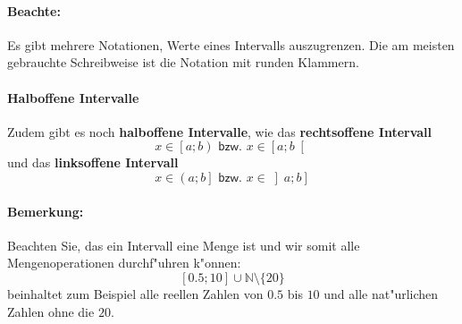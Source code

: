 \paragraph{Beachte:} Es gibt mehrere Notationen, Werte eines Intervalls auszugrenzen. Die am meisten gebrauchte Schreibweise ist die Notation mit runden Klammern.

\paragraph{Halboffene Intervalle}
\begin{flushleft}
Zudem gibt es noch \textbf{halboffene Intervalle}, wie das \textbf{rechtsoffene Intervall}
\begin{equation*}
x \in \left[a;b \right) \textsf{ bzw. } x \in \left[a;b \right[
\end{equation*}
und das \textbf{linksoffene Intervall}
\begin{equation*}
x \in \left(a;b \right] \textsf{ bzw. } x \in \left] a;b \right]
\end{equation*}
\end{flushleft}

\paragraph{Bemerkung:} Beachten Sie, das ein Intervall eine Menge ist und wir somit alle Mengenoperationen durchf"uhren k"onnen:
\begin{equation*}
\left[0.5;10\right] \cup \mathbb{N} \setminus \{20\}
\end{equation*}
beinhaltet zum Beispiel alle reellen Zahlen von $0.5$ bis $10$ und alle nat"urlichen Zahlen ohne die $20$.

